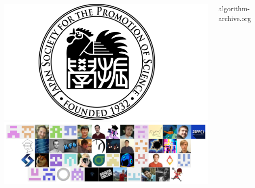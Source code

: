 \documentclass{beamer}
\begin{document}
\begin{frame}
\begin{columns}
\includegraphics[width=\textwidth]{JSPS.png}
\includegraphics[width=\textwidth]{AAA.png}
\begin{center}
{\small algorithm-archive.org}
\end{center}
\end{columns}
\end{frame}
\end{document}
